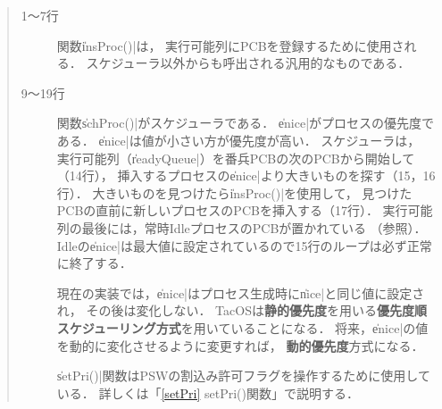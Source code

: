 \begin{quote}
\begin{description}
\item[1〜7行] 関数\|insProc()|は，
実行可能列にPCBを登録するために使用される．
スケジューラ以外からも呼出される汎用的なものである．

\item[9〜19行] 関数\|schProc()|がスケジューラである．
\|enice|がプロセスの優先度である．
\|enice|は値が小さい方が優先度が高い．
スケジューラは，
実行可能列（\|readyQueue|）を番兵PCBの次のPCBから開始して（14行），
挿入するプロセスの\|enice|より大きいものを探す（15，16行）．
大きいものを見つけたら\|insProc()|を使用して，
見つけたPCBの直前に新しいプロセスのPCBを挿入する（17行）．
実行可能列の最後には，常時IdleプロセスのPCBが置かれている
（参照）．
Idleの\|enice|は最大値に設定されているので15行のループは必ず正常に終了する．

現在の実装では，\|enice|はプロセス生成時に\|nice|と同じ値に設定され，
その後は変化しない．
TacOSは{\bf 静的優先度}を用いる{\bf 優先度順スケジューリング方式}を用いていることになる．
将来，\|enice|の値を動的に変化させるように変更すれば，
{\bf 動的優先度}方式になる．

\|setPri()|関数はPSWの割込み許可フラグを操作するために使用している．
詳しくは「\ref{setPri} setPri()関数」で説明する．
\end{description}
\end{quote}
